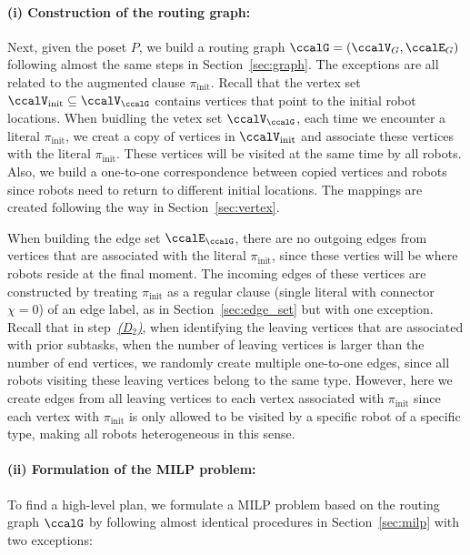 \documentclass[Afour,sageh,times]{sagej}
\newcounter{mycounter}
\begin{document}
{{{  \paragraph{(i) Construction of the routing graph:}   Next, given the poset $P$, we build a routing graph $\ccalG = (\ccalV_G, \ccalE_G)$ following almost the same steps in Section~\ref{sec:graph}. The exceptions are all related to the augmented clause $\pi_{\text{init}}$.  Recall that the vertex set $\ccalV_\text{init} \subseteq \ccalV_\ccalG$ contains vertices that point to the initial robot locations. When buidling the vetex set $\ccalV_\ccalG$, each time we encounter a literal $\pi_{\text{init}}$, we creat a copy of vertices in $\ccalV_{\text{init}}$ and associate these vertices  with the literal $\pi_{\text{init}}$. These vertices will be visited at the same time by all robots.  Also, we build a one-to-one correspondence between copied vertices and robots since  robots need to return to different initial locations. The  mappings are created following the way in Section~\ref{sec:vertex}.

  When  building the edge set $\ccalE_\ccalG$, there are no outgoing edges from  vertices that are associated with the literal $\pi_\text{init}$, since these verties will be where robots reside at the final moment. The incoming edges of these vertices are constructed by treating $\pi_{\text{init}}$ as a regular clause (single literal with connector $\chi=0$) of an edge label, as in Section~\ref{sec:edge_set} but with one exception.  Recall that in step~\hyperref[sec:a]{\it {(D$_2$)}}, when identifying the leaving vertices that are associated with prior subtasks,  when the number of leaving vertices is larger than the number of end vertices, we randomly create multiple  one-to-one edges, since all robots visiting these leaving vertices belong to the same type. However, here we create edges from all leaving vertices to each vertex associated with $\pi_{\text{init}}$ since each vertex with $\pi_{\text{init}}$ is only allowed to be visited by a specific robot of a specific type, making all robots heterogeneous in this sense.
 \paragraph{(ii) Formulation of the MILP problem:}  To find a high-level plan, we formulate a MILP problem based on the routing graph $\ccalG$ by following almost identical procedures in Section~\ref{sec:milp} with two exceptions:

}}}
\end{document}
